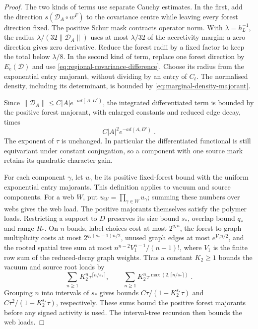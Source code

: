 \documentclass[11pt]{article}
\begin{document}
\begin{proof}
The two kinds of terms use separate Cauchy estimates. In the first, add the direction $s(\mathcal D_A\circ w^F)$ to the covariance centre while leaving every forest direction fixed. The positive Schur mask contracts operator norm. With $\lambda=h_L^{-1}$, the radius $\lambda/(32\|\mathcal D_A\|)$ uses at most $\lambda/32$ of the accretivity margin; a zero direction gives zero derivative. Reduce the forest radii by a fixed factor to keep the total below $\lambda/8$. In the second kind of term, replace one forest direction by $E_e(\mathcal D)$ and use \eqref{eq:regional-covariance-difference}. Choose its radius from the exponential entry majorant, without dividing by an entry of $C_t$. The normalised density, including its determinant, is bounded by \eqref{eq:marginal-density-majorant}.

Since $\|\mathcal D_A\|\leq C|A|e^{-a d(A,D^c)}$, the integrated differentiated term is bounded by the positive forest majorant, with enlarged constants and reduced edge decay, times
\begin{equation}
    C|A|^2e^{-a d(A,D^c)}\;.
\end{equation}
The exponent of $\tau$ is unchanged. In particular the differentiated functional is still equivariant under constant conjugation, so a component with one source mark retains its quadratic character gain.

For each component $\gamma$, let $u_\gamma$ be its positive fixed-forest bound with the uniform exponential entry majorants. This definition applies to vacuum and source components. For a web $W$, put $u_W=\prod_{\gamma\in W}u_\gamma$; summing these numbers over webs gives the web load. The positive majorants themselves satisfy the polymer loads. Restricting a support to $D$ preserves its size bound $s_*$, overlap bound $q_*$ and range $R_*$. On $n$ bonds, label choices cost at most $2^{q_*n}$, the forest-to-graph multiplicity costs at most $2^{q_*(s_*-1)n/2}$, unused graph edges at most $e^{V_1n/2}$, and the rooted spatial tree sum at most $n^{n-2}V_1^{n-1}/(n-1)!$, where $V_1$ is the finite row sum of the reduced-decay graph weights. Thus a constant $K_2\geq1$ bounds the vacuum and source root loads by
\begin{equation}
    \sum_{n\geq1}K_2^n\tau^{\lceil n/s_*\rceil},
    \qquad
    \sum_{n\geq1}K_2^n\tau^{\max(2,\lceil n/s_*\rceil)}\;.
\end{equation}
Grouping $n$ into intervals of $s_*$ gives bounds $C\tau/(1-K_2^{s_*}\tau)$ and $C\tau^2/(1-K_2^{s_*}\tau)$, respectively. These sums bound the positive forest majorants before any signed activity is used. The interval-tree recursion then bounds the web loads.


\end{proof}
\end{document}
